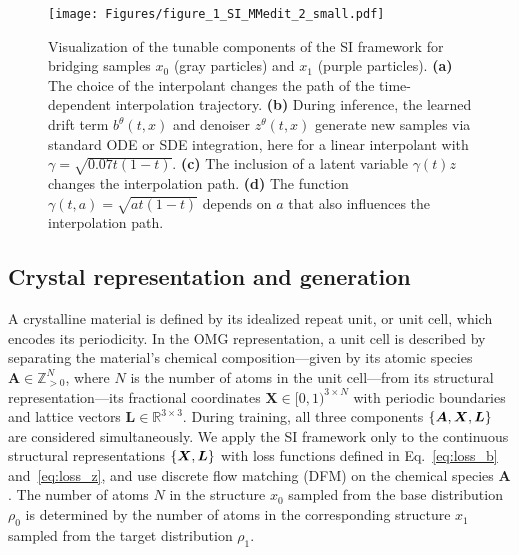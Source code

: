 \begin{figure}[t]
   \centering
   \texttt{[image: Figures/figure\_1\_SI\_MMedit\_2\_small.pdf]}
   \caption{Visualization of the tunable components of the SI framework for bridging samples $x_0$ (gray particles) and $x_1$ (purple particles). \textbf{(a)} The choice of the interpolant changes the path of the time-dependent interpolation trajectory. \textbf{(b)} During inference, the learned drift term $b^\theta(t,x)$ and denoiser $z^\theta(t,x)$ generate new samples via standard ODE or SDE integration, here for a linear interpolant with $\gamma=\sqrt{0.07t(1-t)}$. \textbf{(c)} The inclusion of a latent variable $\gamma(t)z$ changes the interpolation path. \textbf{(d)} The function $\gamma(t, a) = \sqrt{at(1-t)}$ depends on $a$ that also influences the interpolation path.}
   \label{fig:si_viz}
\end{figure}

\subsection{Crystal representation and generation}


A crystalline material is defined by its idealized repeat unit, or unit cell, which encodes its periodicity. 
In the OMG representation, a unit cell is described by separating the material's chemical composition---given by its atomic species $\bm{A} \in \mathbb{Z}_{>0}^N$, where $N$ is the number of atoms in the unit cell---from its structural representation---its fractional coordinates $\bm{X} \in [0, 1)^{3\times N}$ with periodic boundaries and lattice vectors $\bm{L} \in \mathbb{R}^{3 \times 3}$.
During training, all three components $\left\{ \bm{A}, \bm{X}, \bm{L} \right\}$ are considered simultaneously. We apply the SI framework only to the continuous structural representations $\left\{ \bm{X}, \bm{L} \right\}$ with loss functions defined in Eq.~\ref{eq:loss_b} and~\ref{eq:loss_z}, and use discrete flow matching (DFM) on the chemical species $\bm{A}$ \citep{gat_discrete_2024}. The number of atoms $N$ in the structure $x_0$ sampled from the base distribution $\rho_0$ is determined by the number of atoms in the corresponding structure $x_1$ sampled from the target distribution $\rho_1$.
% 

